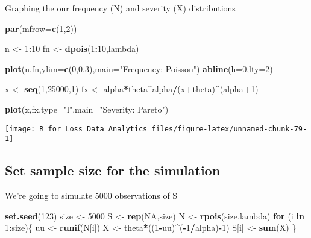\documentclass[]{book}
\newenvironment{Shaded}{\begin{snugshade}}{\end{snugshade}}
\newcommand{\KeywordTok}[1]{\textcolor[rgb]{0.13,0.29,0.53}{\textbf{#1}}}
\newcommand{\DataTypeTok}[1]{\textcolor[rgb]{0.13,0.29,0.53}{#1}}
\newcommand{\DecValTok}[1]{\textcolor[rgb]{0.00,0.00,0.81}{#1}}
\newcommand{\FloatTok}[1]{\textcolor[rgb]{0.00,0.00,0.81}{#1}}
\newcommand{\StringTok}[1]{\textcolor[rgb]{0.31,0.60,0.02}{#1}}
\newcommand{\OtherTok}[1]{\textcolor[rgb]{0.56,0.35,0.01}{#1}}
\newcommand{\ControlFlowTok}[1]{\textcolor[rgb]{0.13,0.29,0.53}{\textbf{#1}}}
\newcommand{\OperatorTok}[1]{\textcolor[rgb]{0.81,0.36,0.00}{\textbf{#1}}}
\newcommand{\NormalTok}[1]{#1}
\theoremstyle{definition}
\theoremstyle{definition}
\theoremstyle{definition}
\theoremstyle{remark}
\begin{document}
Graphing the our frequency (N) and severity (X) distributions

\begin{Shaded}
\begin{Highlighting}[]
\KeywordTok{par}\NormalTok{(}\DataTypeTok{mfrow=}\KeywordTok{c}\NormalTok{(}\DecValTok{1}\NormalTok{,}\DecValTok{2}\NormalTok{))}

\NormalTok{n <-}\StringTok{ }\DecValTok{1}\OperatorTok{:}\DecValTok{10}
\NormalTok{fn <-}\StringTok{ }\KeywordTok{dpois}\NormalTok{(}\DecValTok{1}\OperatorTok{:}\DecValTok{10}\NormalTok{,lambda)}

\KeywordTok{plot}\NormalTok{(n,fn,}\DataTypeTok{ylim=}\KeywordTok{c}\NormalTok{(}\DecValTok{0}\NormalTok{,}\FloatTok{0.3}\NormalTok{),}\DataTypeTok{main=}\StringTok{"Frequency: Poisson"}\NormalTok{)}
\KeywordTok{abline}\NormalTok{(}\DataTypeTok{h=}\DecValTok{0}\NormalTok{,}\DataTypeTok{lty=}\DecValTok{2}\NormalTok{)}

\NormalTok{x <-}\StringTok{ }\KeywordTok{seq}\NormalTok{(}\DecValTok{1}\NormalTok{,}\DecValTok{25000}\NormalTok{,}\DecValTok{1}\NormalTok{)}
\NormalTok{fx <-}\StringTok{ }\NormalTok{alpha}\OperatorTok{*}\NormalTok{theta}\OperatorTok{^}\NormalTok{alpha}\OperatorTok{/}\NormalTok{(x}\OperatorTok{+}\NormalTok{theta)}\OperatorTok{^}\NormalTok{(alpha}\OperatorTok{+}\DecValTok{1}\NormalTok{)}

\KeywordTok{plot}\NormalTok{(x,fx,}\DataTypeTok{type=}\StringTok{"l"}\NormalTok{,}\DataTypeTok{main=}\StringTok{"Severity: Pareto"}\NormalTok{)}
\end{Highlighting}
\end{Shaded}

\begin{center}\texttt{[image: R\_for\_Loss\_Data\_Analytics\_files/figure-latex/unnamed-chunk-79-1]} \end{center}

\subsection{Set sample size for the
simulation}\label{set-sample-size-for-the-simulation}

We're going to simulate 5000 observations of S

\begin{Shaded}
\begin{Highlighting}[]
\KeywordTok{set.seed}\NormalTok{(}\DecValTok{123}\NormalTok{)}
\NormalTok{size <-}\StringTok{ }\DecValTok{5000}
\NormalTok{S <-}\StringTok{ }\KeywordTok{rep}\NormalTok{(}\OtherTok{NA}\NormalTok{,size)}
\NormalTok{N <-}\StringTok{ }\KeywordTok{rpois}\NormalTok{(size,lambda)}
\ControlFlowTok{for}\NormalTok{ (i }\ControlFlowTok{in} \DecValTok{1}\OperatorTok{:}\NormalTok{size)\{}
\NormalTok{  uu <-}\StringTok{ }\KeywordTok{runif}\NormalTok{(N[i])}
\NormalTok{  X <-}\StringTok{ }\NormalTok{theta}\OperatorTok{*}\NormalTok{((}\DecValTok{1}\OperatorTok{-}\NormalTok{uu)}\OperatorTok{^}\NormalTok{(}\OperatorTok{-}\DecValTok{1}\OperatorTok{/}\NormalTok{alpha)}\OperatorTok{-}\DecValTok{1}\NormalTok{)}
\NormalTok{  S[i] <-}\StringTok{ }\KeywordTok{sum}\NormalTok{(X)}
\NormalTok{\}}
\end{Highlighting}
\end{Shaded}
\end{document}
